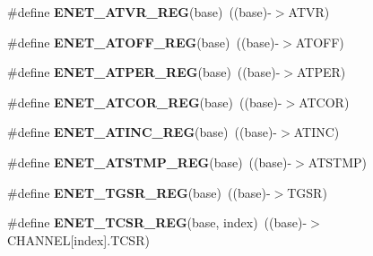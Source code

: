 \begin{DoxyCompactItemize}
\item 
\#define {\bfseries E\+N\+E\+T\+\_\+\+A\+T\+V\+R\+\_\+\+R\+EG}(base)~((base)-\/$>$A\+T\+VR)\hypertarget{group__ENET__Register__Accessor__Macros_ga617ff41003bad76c121aa4830cac62e0}{}\label{group__ENET__Register__Accessor__Macros_ga617ff41003bad76c121aa4830cac62e0}

\item 
\#define {\bfseries E\+N\+E\+T\+\_\+\+A\+T\+O\+F\+F\+\_\+\+R\+EG}(base)~((base)-\/$>$A\+T\+O\+FF)\hypertarget{group__ENET__Register__Accessor__Macros_ga3df11603011fd47de55a17c27300ead3}{}\label{group__ENET__Register__Accessor__Macros_ga3df11603011fd47de55a17c27300ead3}

\item 
\#define {\bfseries E\+N\+E\+T\+\_\+\+A\+T\+P\+E\+R\+\_\+\+R\+EG}(base)~((base)-\/$>$A\+T\+P\+ER)\hypertarget{group__ENET__Register__Accessor__Macros_ga8925d2e7feb44aa151ef2f409ceda379}{}\label{group__ENET__Register__Accessor__Macros_ga8925d2e7feb44aa151ef2f409ceda379}

\item 
\#define {\bfseries E\+N\+E\+T\+\_\+\+A\+T\+C\+O\+R\+\_\+\+R\+EG}(base)~((base)-\/$>$A\+T\+C\+OR)\hypertarget{group__ENET__Register__Accessor__Macros_ga42a0c4d158ce03b9d9afc0999d24aeeb}{}\label{group__ENET__Register__Accessor__Macros_ga42a0c4d158ce03b9d9afc0999d24aeeb}

\item 
\#define {\bfseries E\+N\+E\+T\+\_\+\+A\+T\+I\+N\+C\+\_\+\+R\+EG}(base)~((base)-\/$>$A\+T\+I\+NC)\hypertarget{group__ENET__Register__Accessor__Macros_gab66143cd1e00b4a17ef6454405569e85}{}\label{group__ENET__Register__Accessor__Macros_gab66143cd1e00b4a17ef6454405569e85}

\item 
\#define {\bfseries E\+N\+E\+T\+\_\+\+A\+T\+S\+T\+M\+P\+\_\+\+R\+EG}(base)~((base)-\/$>$A\+T\+S\+T\+MP)\hypertarget{group__ENET__Register__Accessor__Macros_gaf1c3457b86836cea7c5db5caab1ef16f}{}\label{group__ENET__Register__Accessor__Macros_gaf1c3457b86836cea7c5db5caab1ef16f}

\item 
\#define {\bfseries E\+N\+E\+T\+\_\+\+T\+G\+S\+R\+\_\+\+R\+EG}(base)~((base)-\/$>$T\+G\+SR)\hypertarget{group__ENET__Register__Accessor__Macros_ga79be8d28317c618cee68253311e225c0}{}\label{group__ENET__Register__Accessor__Macros_ga79be8d28317c618cee68253311e225c0}

\item 
\#define {\bfseries E\+N\+E\+T\+\_\+\+T\+C\+S\+R\+\_\+\+R\+EG}(base,  index)~((base)-\/$>$C\+H\+A\+N\+N\+EL\mbox{[}index\mbox{]}.T\+C\+SR)\hypertarget{group__ENET__Register__Accessor__Macros_gaa0c9a6934bdfa86ee962fba93d4b50bf}{}\label{group__ENET__Register__Accessor__Macros_gaa0c9a6934bdfa86ee962fba93d4b50bf}


\end{DoxyCompactItemize}

